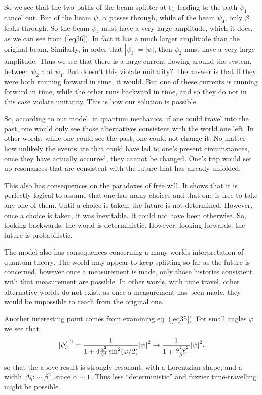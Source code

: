 So we see that the two paths of the beam-splitter at t$_{{\rm 1}}$ leading
to the path $\psi _{1} $ cancel out. But of the beam $\psi $, $\alpha $
passes through, while of the beam $\psi _{4} $, only $\beta $ leaks through.
So the beam $\psi _{4} $ must have a very large amplitude, which it does, as
we can see from (\ref{eq36}). In fact it has a much larger amplitude than the
original beam. Similarly, in order that ${\left| {\psi _{3} ^{\prime}}
\right|} = {\left| {\psi}  \right|}$, then $\psi _{2} $ must have a very
large amplitude. Thus we see that there is a large current flowing around
the system, between $\psi _{2} $ and $\psi _{4} $. But doesn't this violate
unitarity? The answer is that if they were both running forward in time, it
would. But one of these currents is running forward in time, while the other
runs backward in time, and so they do not in this case violate unitarity.
This is how our solution is possible.

So, according to our model, in quantum mechanics, if one could travel into
the past, one would only see those alternatives consistent with the world
one left. In other words, while one could see the past, one could not change
it. No matter how unlikely the events are that could have led to one's
present circumstances, once they have actually occurred, they cannot be
changed. One's trip would set up resonances that are consistent with the
future that has already unfolded.

This also has  consequences on the paradoxes of free will. It shows
that it is perfectly logical to assume that one has many choices and that
one is free to take any one of them. Until a choice is taken, the future is
not determined. However, once a choice is taken, it was inevitable. It could
not have been otherwise. So, looking backwards, the world is deterministic.
However, looking forwards, the future is probabilistic.

The model also has consequences concerning a many worlds interpretation of
quantum theory. The world may appear to keep splitting so far as the future
is concerned, however once a measurement is made, only those histories
consistent with that measurement are possible. In other words, with time
travel, other alternative worlds do not exist, as once a measurement has
been made, they would be impossible to reach from the original one.

Another interesting point comes from examining eq. (\ref{eq35}). For small angles
$\varphi $ we see that
\begin{equation}
\label{eq37}
{\left| {\psi _{3} ^{\prime}}  \right|}^{2} = {\frac{{1}}{{1 +
4{\textstyle{{\alpha ^{2}} \over {\beta ^{4}}}}\sin ^{2}(\varphi /
2)}}}{\left| {\psi}  \right|}^{2} \to {\frac{{1}}{{1 + {\textstyle{{\alpha
^{2}\varphi ^{2}} \over {\beta ^{4}}}}}}}{\left| {\psi}  \right|}^{2},
\end{equation}
so that the above result is strongly resonant, with a Lorentzian shape, and
a width $\Delta \varphi \sim \beta ^{2}$, since $\alpha \sim 1$. Thus less
``deterministic'' and fuzzier time-travelling might be possible.


